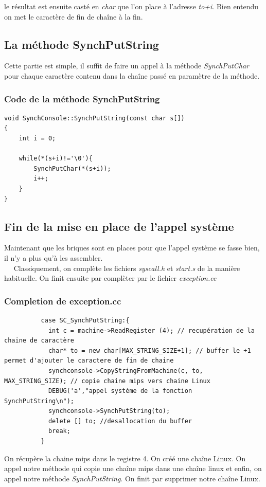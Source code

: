 \documentclass[a4paper,10pt]{report}
\begin{document}
 le résultat est ensuite casté en \emph{char} que l'on place à l'adresse \emph{to+i}. Bien entendu on met le caractère de fin de chaîne à la fin.
 \textcolor{NavyBlue}{\subsection{La méthode SynchPutString}}
 Cette partie est simple, il suffit de faire un appel à la méthode \emph{SynchPutChar} pour chaque caractère contenu dans la chaîne passé en paramètre de la
 méthode.
 \textcolor{TealBlue}{\subsubsection*{Code de la méthode SynchPutString}}
  \begin{lstlisting}
void SynchConsole::SynchPutString(const char s[])
{
	int i = 0;

	while(*(s+i)!='\0'){
		SynchPutChar(*(s+i));
		i++;
	}
}   
  \end{lstlisting}

   \textcolor{NavyBlue}{\subsection{Fin de la mise en place de l'appel système}}
   Maintenant que les briques sont en places pour que l'appel système se fasse bien, il n'y a plus qu'à les assembler. 
   \\~~
   Classiquement, on complète les fichiers \emph{syscall.h} et \emph{start.s} de la manière habituelle.
   On finit ensuite par complèter par le fichier \emph{exception.cc}
   \textcolor{TealBlue}{\subsubsection*{Completion de exception.cc}}
   \begin{lstlisting}
          case SC_SynchPutString:{
            int c = machine->ReadRegister (4); // recupération de la chaine de caractère
            char* to = new char[MAX_STRING_SIZE+1]; // buffer le +1 permet d'ajouter le caractere de fin de chaine
            synchconsole->CopyStringFromMachine(c, to, MAX_STRING_SIZE); // copie chaine mips vers chaine Linux
            DEBUG('a',"appel système de la fonction SynchPutString\n");
            synchconsole->SynchPutString(to);
            delete [] to; //desallocation du buffer
            break;
          }    
   \end{lstlisting}
  On récupère la chaine mips dans le registre 4. On créé une chaîne Linux. On appel notre méthode qui copie une chaîne mips dans une chaîne linux et enfin,
  on appel notre méthode \emph{SynchPutString}. On finit par supprimer notre chaîne Linux.
  
\end{document}
